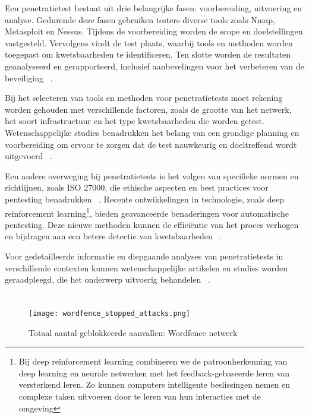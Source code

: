Een penetratietest bestaat uit drie belangrijke fasen: voorbereiding, uitvoering en analyse. Gedurende deze fasen gebruiken 
testers diverse tools zoals Nmap, Metasploit en Nessus. Tijdens de voorbereiding worden de scope en doelstellingen vastgesteld. 
Vervolgens vindt de test plaats, waarbij tools en methoden worden toegepast om kwetsbaarheden te identificeren. 
Ten slotte worden de resultaten geanalyseerd en gerapporteerd, inclusief aanbevelingen voor het verbeteren van de beveiliging 
~\autocite{Sarker2023}.

Bij het selecteren van tools en methoden voor penetratietests moet rekening worden gehouden met verschillende factoren, zoals de 
grootte van het netwerk, het soort infrastructuur en het type kwetsbaarheden die worden getest. Wetenschappelijke studies 
benadrukken het belang van een grondige planning en voorbereiding om ervoor te zorgen dat de test nauwkeurig en doeltreffend 
wordt uitgevoerd ~\autocite{Alhamed2023}.

Een andere overweging bij penetratietests is het volgen van specifieke normen en richtlijnen, zoals ISO 27000, die ethische 
aspecten en best practices voor pentesting benadrukken ~\autocite{DalalanaBertoglio2017}. Recente ontwikkelingen in technologie, zoals deep 
reinforcement learning\footnote{Bij deep reinforcement learning combineren we de patroonherkenning van deep learning en neurale 
netwerken met het feedback-gebaseerde leren van versterkend leren. Zo kunnen computers intelligente beslissingen nemen en complexe 
taken uitvoeren door te leren van hun interacties met de omgeving}, bieden geavanceerde benaderingen voor automatische pentesting. 
Deze nieuwe methoden kunnen de efficiëntie van het proces verhogen en bijdragen aan een betere detectie van kwetsbaarheden 
~\autocite{Yi2023}.

Voor gedetailleerde informatie en diepgaande analyses van penetratietests in verschillende contexten kunnen wetenschappelijke 
artikelen en studies worden geraadpleegd, die het onderwerp uitvoerig behandelen ~\autocite{Sarker2023}.

\section{}
\label{sec:Webomgevingen}

\subsection{}
\label{sec:Veiligheidskwetsbaarheden in Webomgevingen}
\begin{figure}
    \centering
    \texttt{[image: wordfence\_stopped\_attacks.png]}
    \caption[Totaal aantal geblokkeerde aanvallen: Wordfence netwerk]{Totaal aantal geblokkeerde aanvallen: Wordfence netwerk}
\end{figure}

